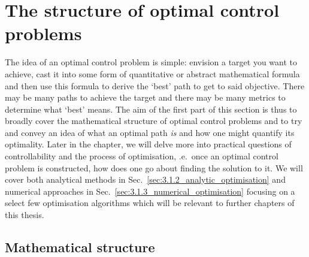 \section{The structure of optimal control problems}\label{sec:3.1_structure_quantum_control}

The idea of an optimal control problem is simple: envision a target you want to achieve, cast it into some form of quantitative or abstract mathematical formula and then use this formula to derive the `best' path to get to said objective. There may be many paths to achieve the target and there may be many metrics to determine what `best' means. The aim of the first part of this section is thus to broadly cover the mathematical structure of optimal control problems and to try and convey an idea of what an optimal path \emph{is} and how one might quantify its optimality. Later in the chapter, we will delve more into practical questions of controllability and the process of optimisation, \@i.e.~once an optimal control problem is constructed, how does one go about finding the solution to it. We will cover both analytical methods in Sec.~\ref{sec:3.1.2_analytic_optimisation} and numerical approaches in Sec.~\ref{sec:3.1.3_numerical_optimisation} focusing on a select few optimisation algorithms which will be relevant to further chapters of this thesis. 

\subsection{Mathematical structure}\label{sec:3.1.1_mathematical_structure}

